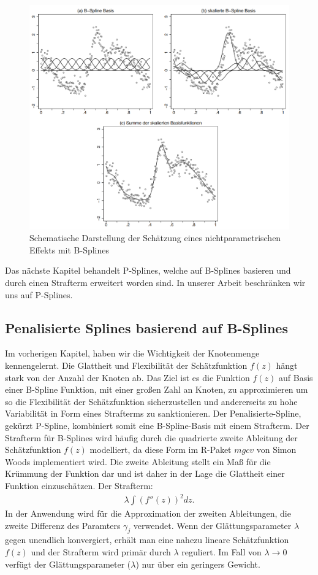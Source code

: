 \documentclass[12pt]{scrreprt}
\begin{document}
	\begin{figure}[H]
		\centering
		\includegraphics[width=.9\textwidth]{b_spline}
		\caption{Schematische Darstellung der Schätzung eines nichtparametrischen Effekts mit B-Splines}
		\label{pic:b_spline}
	\end{figure}
	
	\noindent Das nächste Kapitel behandelt P-Splines, welche auf B-Splines basieren und durch einen Strafterm erweitert worden sind. In unserer Arbeit beschränken wir uns auf P-Splines.
	
	
	
	\subsection{Penalisierte Splines basierend auf B-Splines} 
	Im vorherigen Kapitel, haben wir die Wichtigkeit der Knotenmenge kennengelernt. Die Glattheit und Flexibilität der Schätzfunktion $f(z)$ hängt stark von der Anzahl der Knoten ab. Das Ziel ist es die Funktion $f(z)$ auf Basis einer B-Spline Funktion, mit einer großen Zahl an Knoten, zu approximieren um so die Flexibilität der Schätzfunktion sicherzustellen und andererseits zu hohe Variabilität in Form eines Strafterms zu sanktionieren. Der Penalisierte-Spline, gekürzt P-Spline, kombiniert somit eine B-Spline-Basis mit einem Strafterm. Der Strafterm für B-Splines wird häufig durch die quadrierte zweite Ableitung der Schätzfunktion $f(z)$ modelliert, da diese Form im R-Paket $mgcv$ von Simon Woods implementiert wird. Die zweite Ableitung stellt ein Maß für die Krümmung der Funktion dar und ist daher in der Lage die Glattheit einer Funktion einzuschätzen.
	Der Strafterm: 
	\begin{align}
	\lambda\int(f''(z))^2dz.
	\end{align}
	In der Anwendung wird für die Approximation der zweiten Ableitungen, die zweite Differenz des Paramters $\gamma_{j}$ verwendet. Wenn der Glättungsparameter $\lambda$ gegen unendlich konvergiert, erhält man eine nahezu lineare Schätzfunktion $f(z)$ und der Strafterm wird primär durch $\lambda$ reguliert. Im Fall von $\lambda \to 0$ verfügt der Glättungsparameter ($\lambda$) nur über ein geringers Gewicht. 
	
\end{document}
